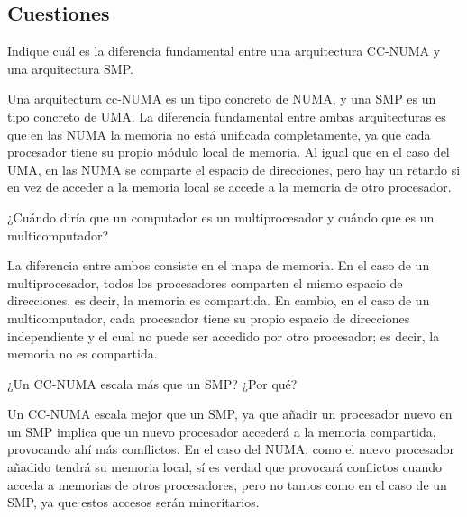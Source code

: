 \subsection{Cuestiones}
\begin{cuestion}
    Indique cuál es la diferencia fundamental entre una arquitectura CC-NUMA y una arquitectura
    SMP.

    Una arquitectura cc-NUMA es un tipo concreto de NUMA, y una SMP es un tipo concreto de UMA.
    La diferencia fundamental entre ambas arquitecturas es que en las NUMA la memoria no está unificada
    completamente, ya que cada procesador tiene su propio módulo local de memoria.
    Al igual que en el caso del UMA, en las NUMA se comparte el espacio de direcciones, pero hay un retardo
    si en vez de acceder a la memoria local se accede a la memoria de otro procesador.
\end{cuestion}

\begin{cuestion}
    ¿Cuándo diría que un computador es un multiprocesador y cuándo que es un multicomputador?

    La diferencia entre ambos consiste en el mapa de memoria.
    En el caso de un multiprocesador, todos los procesadores comparten el mismo espacio de direcciones, es decir, la memoria es compartida.
    En cambio, en el caso de un multicomputador, cada procesador tiene su propio espacio de direcciones independiente y el cual no puede ser accedido por otro procesador; es decir, la memoria no es compartida.
\end{cuestion}

\begin{cuestion}
    ¿Un CC-NUMA escala más que un SMP? ¿Por qué?

    Un CC-NUMA escala mejor que un SMP, ya que añadir un procesador nuevo en un SMP implica que un nuevo procesador accederá a la memoria
    compartida, provocando ahí más comflictos. En el caso del NUMA, como el nuevo procesador añadido tendrá su memoria local, sí es verdad que provocará conflictos
    cuando acceda a memorias de otros procesadores, pero no tantos como en el caso de un SMP, ya que estos accesos serán minoritarios.
\end{cuestion}

